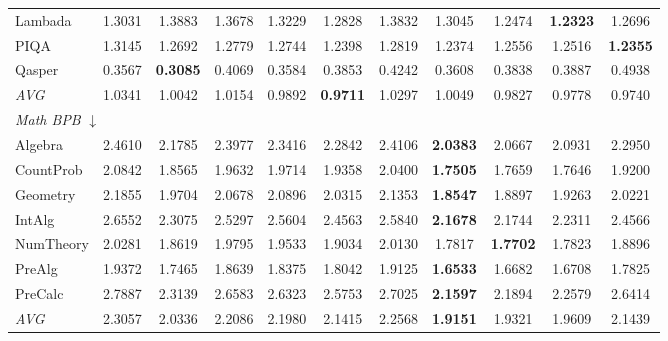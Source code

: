 \begin{table}[htbp]
\begin{tabular}{lcccccccccc}
Lambada & 1.3031 & 1.3883 & 1.3678 & 1.3229 & 1.2828 & 1.3832 & 1.3045 & 1.2474 & \textbf{1.2323} & 1.2696 \\
PIQA & 1.3145 & 1.2692 & 1.2779 & 1.2744 & 1.2398 & 1.2819 & 1.2374 & 1.2556 & 1.2516 & \textbf{1.2355} \\
Qasper & 0.3567 & \textbf{0.3085} & 0.4069 & 0.3584 & 0.3853 & 0.4242 & 0.3608 & 0.3838 & 0.3887 & 0.4938 \\
\textit{AVG} & 1.0341 & 1.0042 & 1.0154 & 0.9892 & \textbf{0.9711} & 1.0297 & 1.0049 & 0.9827 & 0.9778 & 0.9740 \\
\midrule
\multicolumn{11}{l}{\textit{Math BPB} $\downarrow$} \\
Algebra & 2.4610 & 2.1785 & 2.3977 & 2.3416 & 2.2842 & 2.4106 & \textbf{2.0383} & 2.0667 & 2.0931 & 2.2950 \\
CountProb & 2.0842 & 1.8565 & 1.9632 & 1.9714 & 1.9358 & 2.0400 & \textbf{1.7505} & 1.7659 & 1.7646 & 1.9200 \\
Geometry & 2.1855 & 1.9704 & 2.0678 & 2.0896 & 2.0315 & 2.1353 & \textbf{1.8547} & 1.8897 & 1.9263 & 2.0221 \\
IntAlg & 2.6552 & 2.3075 & 2.5297 & 2.5604 & 2.4563 & 2.5840 & \textbf{2.1678} & 2.1744 & 2.2311 & 2.4566 \\
NumTheory & 2.0281 & 1.8619 & 1.9795 & 1.9533 & 1.9034 & 2.0130 & 1.7817 & \textbf{1.7702} & 1.7823 & 1.8896 \\
PreAlg & 1.9372 & 1.7465 & 1.8639 & 1.8375 & 1.8042 & 1.9125 & \textbf{1.6533} & 1.6682 & 1.6708 & 1.7825 \\
PreCalc & 2.7887 & 2.3139 & 2.6583 & 2.6323 & 2.5753 & 2.7025 & \textbf{2.1597} & 2.1894 & 2.2579 & 2.6414 \\
\textit{AVG} & 2.3057 & 2.0336 & 2.2086 & 2.1980 & 2.1415 & 2.2568 & \textbf{1.9151} & 1.9321 & 1.9609 & 2.1439 \\
\bottomrule
\end{tabular}
\end{table}

